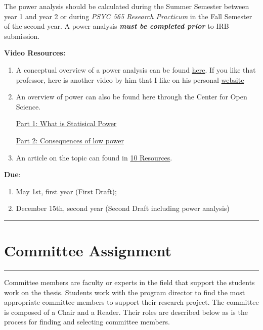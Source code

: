 \documentclass[openany]{book}
\providecommand{\tightlist}{%
  \setlength{\itemsep}{0pt}\setlength{\parskip}{0pt}}
\begin{document}
The power analysis should be calculated during the Summer Semester between year 1 and year 2 or during \emph{PSYC 565 Research Practicum} in the Fall Semester of the second year. A power analysis \textbf{\emph{must be completed prior}} to IRB submission.

\textbf{Video Resources:}

\begin{enumerate}
\def\labelenumi{\arabic{enumi}.}
\item
  A conceptual overview of a power analysis can be found \href{https://www.youtube.com/watch?v=Lr-i4Ugoc5M}{here}. If you like that professor, here is another video by him that I like on his personal \href{https://www.youtube.com/watch?v=XhfkodpyIsw}{website}
\item
  An overview of power can also be found here through the Center for Open Science.

  \href{https://www.youtube.com/watch?v=-ZU7fbvSJ60}{Part 1: What is Statisical Power}

  \href{https://www.youtube.com/watch?v=7daQRvRO-NE}{Part 2: Consequences of low power}
\item
  An article on the topic can found in \protect\hyperlink{resources}{10 Resources}.
\end{enumerate}

\textbf{Due}:

\begin{enumerate}
\def\labelenumi{\arabic{enumi}.}
\tightlist
\item
  May 1st, first year (First Draft);
\item
  December 15th, second year (Second Draft including power analysis)
\end{enumerate}

\begin{center}\rule{0.5\linewidth}{0.5pt}\end{center}

\hypertarget{committee-assignment}{%
\section{Committee Assignment}\label{committee-assignment}}

\begin{center}\rule{0.5\linewidth}{0.5pt}\end{center}

Committee members are faculty or experts in the field that support the students work on the thesis. Students work with the program director to find the most appropriate committee members to support their research project. The committee is composed of a Chair and a Reader. Their roles are described below as is the process for finding and selecting committee members.
\end{document}
